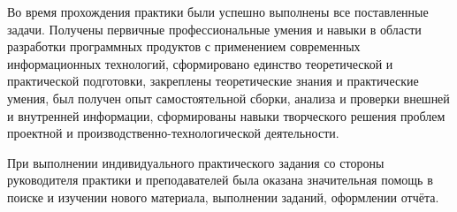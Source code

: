 \documentclass[../document.tex]{subfiles}
\begin{document}
    \par Во время прохождения практики были успешно выполнены все поставленные
 задачи. Получены первичные профессиональные умения и навыки в области разработки программных продуктов с применением современных информационных технологий, сформировано единство теоретической и практической подготовки, закреплены теоретические знания и практические умения, был получен опыт самостоятельной сборки, анализа и проверки внешней и внутренней информации, сформированы навыки творческого решения проблем проектной и производственно-технологической деятельности.
    \par При выполнении индивидуального практического задания со стороны руководителя практики и преподавателей была оказана значительная помощь в поиске и изучении нового материала, выполнении заданий, оформлении отчёта.
\end{document}
